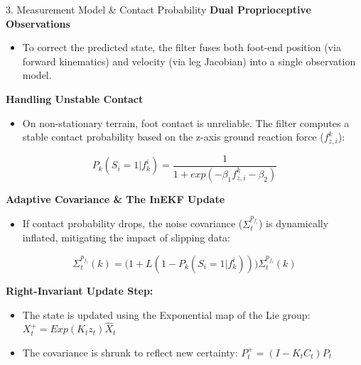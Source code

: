 \documentclass[aspectratio=169, 9pt]{beamer}
\begin{document}
\begin{frame}[t]{3. Measurement Model \& Contact Probability}
    \textbf{Dual Proprioceptive Observations}
    \begin{itemize}
        \item To correct the predicted state, the filter fuses both foot-end position (via forward kinematics) and velocity (via leg Jacobian) into a single observation model.
    \end{itemize}

    \vspace{0.3cm}
    \textbf{Handling Unstable Contact}
    \begin{itemize}
        \item On non-stationary terrain, foot contact is unreliable. The filter computes a stable contact probability based on the z-axis ground reaction force ($f_{z,i}^{k}$):
    \end{itemize}
    
    \begin{equation}
        P_{k}(S_{i}=1|f_{k}^{i}) = \frac{1}{1+exp(-\beta_{1}f_{z,i}^{k}-\beta_{2})}
    \end{equation}

    \vspace{0.3cm}
    \textbf{Adaptive Covariance \& The InEKF Update}
    \begin{itemize}
        \item If contact probability drops, the noise covariance ($\Sigma_{t}^{p_{f_{i}}}$) is dynamically inflated, mitigating the impact of slipping data:
    \end{itemize}
    
    \begin{equation}
        \Sigma_{t}^{p_{f_{i}}}(k) = \big(1+L(1-P_{k}(S_{i}=1|f_{k}^{i}))\big)\Sigma_{t}^{p_{f_{i}}}(k)
    \end{equation}

    {\tiny
    \textbf{Right-Invariant Update Step:}
    \begin{itemize}
        \item The state is updated using the Exponential map of the Lie group: $X_{t}^{+} = Exp(K_{t}z_{t})\hat{X}_{t}$
        \item The covariance is shrunk to reflect new certainty: $P_{t}^{+} = (I-K_{t}C_{t})P_{t}$
    \end{itemize}
    }
\end{frame}
\end{document}
